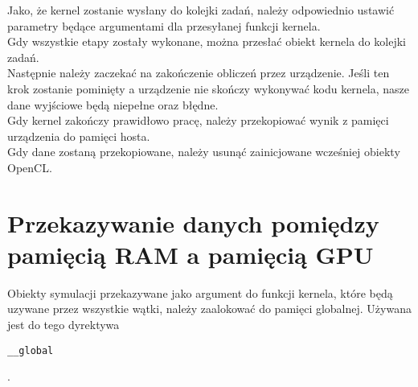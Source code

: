 Jako, że kernel zostanie wysłany do kolejki zadań, należy odpowiednio ustawić parametry będące argumentami dla przesyłanej funkcji kernela. \\
Gdy wszystkie etapy zostały wykonane, można przesłać obiekt kernela do kolejki zadań. \\
Następnie należy zaczekać na zakończenie obliczeń przez urządzenie. Jeśli ten krok zostanie pominięty a urządzenie nie skończy wykonywać kodu kernela, nasze dane wyjściowe będą niepełne oraz błędne. \\
Gdy kernel zakończy prawidłowo pracę, należy przekopiować wynik z pamięci urządzenia do pamięci hosta. \\
Gdy dane zostaną przekopiowane, należy usunąć zainicjowane wcześniej obiekty OpenCL. \\

\section{Przekazywanie danych pomiędzy pamięcią RAM a pamięcią GPU}
Obiekty symulacji przekazywane jako argument do funkcji kernela, które będą uzywane przez wszystkie wątki, należy zaalokować do pamięci globalnej. Używana jest do tego dyrektywa  \begin{verbatim}__global\end{verbatim}. 
